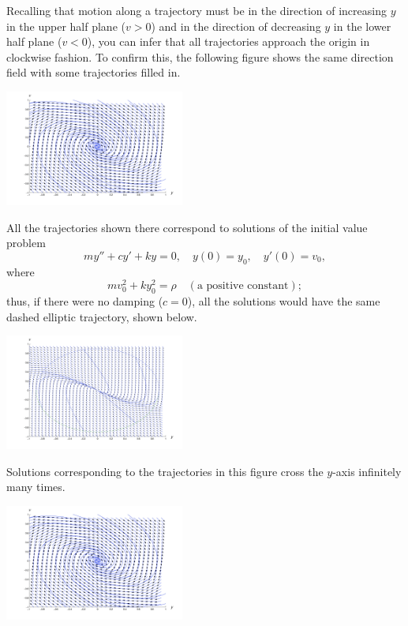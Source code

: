 \documentclass{ximera}
\begin{document}
 
Recalling that
motion along a trajectory must be in the direction of increasing $y$
in the upper half plane ($v>0$) and in the direction of decreasing $y$
in the lower half plane ($v<0$), you can infer that all trajectories
approach the origin in clockwise fashion. To confirm this, the following figure shows the same direction field with some
trajectories filled in.
 
\begin{image}
 \includegraphics[height=1.5in]{fig040412.jpg}
\end{image}
 
 
All the trajectories shown there correspond to
solutions of the initial value problem
$$
my''+cy'+ky=0,\quad y(0)=y_0,\quad y'(0)=v_0,
$$
where
$$
mv_0^2+ky_0^2=\rho\quad (\mbox{a positive constant});
$$
thus, if there were no damping ($c=0$),  all the solutions would
have the same dashed elliptic trajectory, shown below.
 
\begin{image}
 \includegraphics[height=1.5in]{fig040414.jpg}
\end{image}
 
Solutions corresponding to the trajectories in
this figure cross the $y$-axis infinitely many times.
 
\begin{image}
 \includegraphics[height=1.5in]{fig040412.jpg}
\end{image}
 
\end{document}
